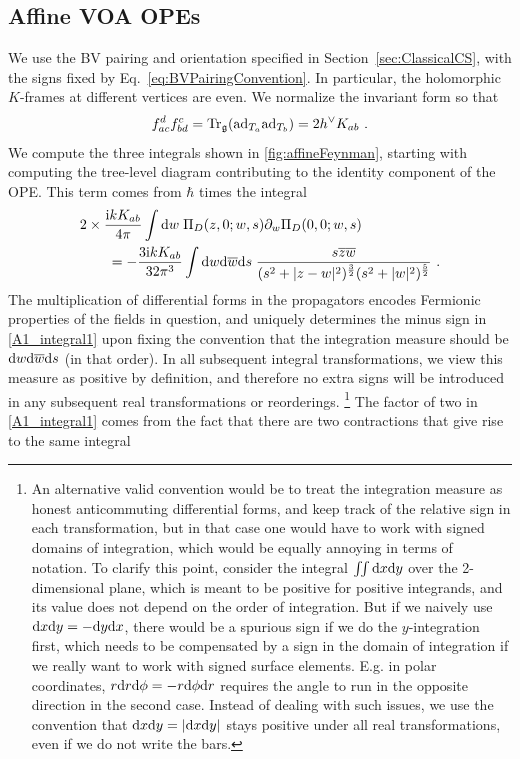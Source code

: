 \documentclass[11pt]{amsart}
\numberwithin{equation}{section}
\numberwithin{figure}{section}
\numberwithin{table}{section}
\begin{document}
\subsection{Affine VOA OPEs}\label{app:AffineOPEs}
We use the BV pairing and orientation specified in Section~\ref{sec:ClassicalCS}, with the signs fixed by Eq.~\eqref{eq:BVPairingConvention}.
In particular, the holomorphic $K$-frames at different vertices are even.
We normalize the invariant form so that
\begin{align}\label{dual_Coxeter_number}
    f^d_{ac}f^c_{bd}=\operatorname{Tr}_{\mathfrak{g}}(\mathrm{ad}_{T_a}\mathrm{ad}_{T_b})=2h^\vee K_{ab}~.
\end{align}
We compute the three integrals shown in \cref{fig:affineFeynman}, starting with computing the tree-level diagram contributing to the identity component of the OPE.
This term comes from $\hbar$ times the integral
\begin{align} \label{A1_integral1}
	& 2 \times \frac{\text{i} k K_{ab}}{4 \pi}\int \mathrm{d} w \; \Pi_D(z,0;w,s) \partial_w\Pi_D(0,0;w,s) \nonumber \\
	& \qquad = -\frac{3\text{i} k K_{ab}}{32 \pi^3} \int \mathrm{d} w \mathrm{d} {\overline{w}} \mathrm{d} s \; \frac{s {\overline{z}} {\overline{w}}}{(s^2 + |z-w|^2)^{\scriptstyle{\frac{3}{2}}}(s^2+|w|^2)^{\scriptstyle{\frac{5}{2}}}}~.
\end{align}
The multiplication of differential forms in the propagators encodes Fermionic properties of the fields in question, and uniquely determines the minus sign in \cref{A1_integral1} upon fixing the convention that the integration measure should be $\mathrm{d} w \mathrm{d} {\overline{w}} \mathrm{d} s$ (in that order).
In all subsequent integral transformations, we view this measure as positive by definition, and therefore no extra signs will be introduced in any subsequent real transformations or reorderings.%
%
\footnote{An alternative valid convention would be to treat the integration measure as honest anticommuting differential forms, and keep track of the relative sign in each transformation, but in that case one would have to work with signed domains of integration, which would be equally annoying in terms of notation. To clarify this point, consider the integral $\iint \mathrm{d} x \mathrm{d} y$ over the 2-dimensional plane, which is meant to be positive for positive integrands, and its value does not depend on the order of integration. But if we naively use    $\mathrm{d} x \mathrm{d} y = - \mathrm{d} y \mathrm{d} x$, there would be a spurious sign if we do the $y$-integration first, which needs to be compensated by a sign in the domain of integration if we really want to work with signed surface elements. E.g. in polar coordinates, $r \mathrm{d} r \mathrm{d} \phi = - r \mathrm{d} \phi \mathrm{d} r$ requires the angle to run in the opposite direction in the second case. Instead of dealing with such issues, we use the convention that $\mathrm{d} x \mathrm{d} y = |\mathrm{d} x \mathrm{d} y|$ stays positive under all real transformations, even if we do not write the bars.} %
%  
The factor of two in \cref{A1_integral1} comes from the fact that there are two contractions that give rise to the same integral
\end{document}
